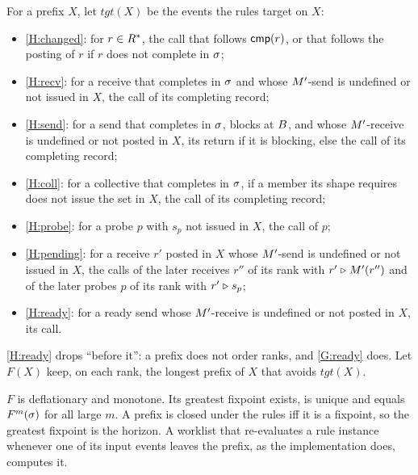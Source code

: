 For a prefix $X$, let $\mathit{tgt}(X)$ be the events the rules target on $X$:
\begin{itemize}[leftmargin=*]
\item \ref{H:changed}: for $r\in R^{*}$, the call that follows $\mathsf{cmp}(r)$, or that follows the
  posting of $r$ if $r$ does not complete in $\sigma$;
\item \ref{H:recv}: for a receive that completes in $\sigma$ and whose $M'$-send is undefined
  or not issued in $X$, the call of its completing record;
\item \ref{H:send}: for a send that completes in $\sigma$, blocks at $B$, and whose
  $M'$-receive is undefined or not posted in $X$, its return if it is blocking, else the call
  of its completing record;
\item \ref{H:coll}: for a collective that completes in $\sigma$, if a member its shape requires
  does not issue the set in $X$, the call of its completing record;
\item \ref{H:probe}: for a probe $p$ with $s_p$ not issued in $X$, the call of $p$;
\item \ref{H:pending}: for a receive $r'$ posted in $X$ whose $M'$-send is undefined or not
  issued in $X$, the calls of the later receives $r''$ of its rank with $r'\mathrel{\triangleright}M'(r'')$
  and of the later probes $p$ of its rank with $r'\mathrel{\triangleright} s_p$;
\item \ref{H:ready}: for a ready send whose $M'$-receive is undefined or not posted in $X$,
  its call.
\end{itemize}
\ref{H:ready} drops ``before it'': a prefix does not order ranks, and \ref{G:ready} does. Let
$F(X)$ keep, on each rank, the longest prefix of $X$ that avoids $\mathit{tgt}(X)$.

\begin{lemma}\label{lem:app-fix}
$F$ is deflationary and monotone. Its greatest fixpoint exists, is unique and equals
$F^m(\sigma)$ for all large $m$. A prefix is closed under the rules iff it is a fixpoint, so
the greatest fixpoint is the horizon. A worklist that re-evaluates a rule instance whenever one
of its input events leaves the prefix, as the implementation does, computes it.
\end{lemma}

